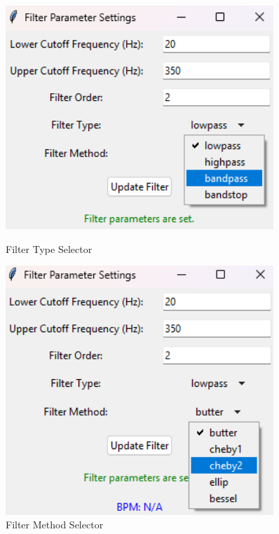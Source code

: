 \begin{figure}[h]
	\centering
	\begin{minipage}{0.5\textwidth}
		\includegraphics[width=0.9\textwidth , height=0.2\textheight]{assets/filter-type-selector.png}
		\caption{Filter Type Selector}
		\label{fig:gui-filter-type-selector}
	\end{minipage}%
	\begin{minipage}{0.5\textwidth}
		\includegraphics[width=0.9\textwidth , height=0.2\textheight]{assets/filter-method-selector.png}
		\caption{Filter Method Selector}
		\label{fig:gui-filter-method-selector}
	\end{minipage}
\end{figure}
